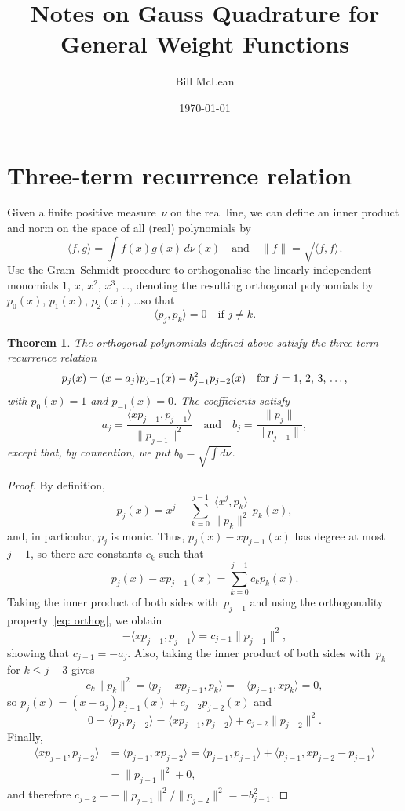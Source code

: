 \documentclass[12pt,a4paper]{article}
\title{Notes on Gauss Quadrature for General Weight Functions}
\author{Bill McLean}
\date{\today}
\newtheorem{theorem}{Theorem}
\newcommand{\iprod}[1]{\langle#1\rangle}
\begin{document}
\maketitle
\section{Three-term recurrence relation}
Given a finite positive measure~$\nu$ on the real line, we can define 
an inner product and norm on the space of all (real) polynomials by
\[
\iprod{f,g}=\int f(x)g(x)\,d\nu(x)\quad\text{and}\quad
\|f\|=\sqrt{\iprod{f,f}}.
\]
Use the Gram--Schmidt procedure to orthogonalise the linearly 
independent monomials $1$, $x$, $x^2$, $x^3$, \dots, denoting the 
resulting orthogonal polynomials by $p_0(x)$, $p_1(x)$, $p_2(x)$, 
\dots so that
\begin{equation}\label{eq: orthog}
\iprod{p_j,p_k}=0\quad\text{if $j\ne k$.}
\end{equation}

\begin{theorem}\label{thm: 3 term}
The orthogonal polynomials defined above satisfy the three-term 
recurrence relation
\[
p_j(x)=(x-a_j)p_{j-1}(x)-b_{j-1}^2p_{j-2}(x)
	\quad\text{for $j=1$, $2$, $3$, \dots,}
\]
with $p_0(x)=1$ and $p_{-1}(x)=0$.  The coefficients satisfy
\[
a_j=\frac{\iprod{xp_{j-1},p_{j-1}}}{\|p_{j-1}\|^2}
\quad\text{and}\quad
b_j=\frac{\|p_j\|}{\|p_{j-1}\|},
\]
except that, by convention, we put $b_0=\sqrt{\int d\nu}$.
\end{theorem}
\begin{proof}
By definition,
\[
p_j(x)=x^j-\sum_{k=0}^{j-1}\frac{\iprod{x^j,p_k}}{\|p_k\|^2}\,p_k(x),
\]
and, in particular, $p_j$ is monic.  Thus, $p_j(x)-xp_{j-1}(x)$ has
degree at most~$j-1$, so there are constants $c_k$ such that
\[
p_j(x)-xp_{j-1}(x)=\sum_{k=0}^{j-1}c_kp_k(x).
\]
Taking the inner product of both sides with~$p_{j-1}$ and using
the orthogonality property~\eqref{eq: orthog}, we obtain
\[
-\iprod{xp_{j-1},p_{j-1}}=c_{j-1}\|p_{j-1}\|^2,
\]
showing that $c_{j-1}=-a_j$.  Also, taking the inner product of both
sides with~$p_k$ for $k\le j-3$ gives
\[
c_k\|p_k\|^2=\iprod{p_j-xp_{j-1},p_k}=-\iprod{p_{j-1},xp_k}=0,
\]
so $p_j(x)=(x-a_j)p_{j-1}(x)+c_{j-2}p_{j-2}(x)$ and
\[
0=\iprod{p_j,p_{j-2}}=\iprod{xp_{j-1},p_{j-2}}+c_{j-2}\|p_{j-2}\|^2.
\]
Finally, 
\begin{align*}
\iprod{xp_{j-1},p_{j-2}}&=\iprod{p_{j-1},xp_{j-2}}
	=\iprod{p_{j-1},p_{j-1}}+\iprod{p_{j-1},xp_{j-2}-p_{j-1}}\\
	&=\|p_{j-1}\|^2+0,
\end{align*}
and therefore $c_{j-2}=-\|p_{j-1}\|^2/\|p_{j-2}\|^2=-b_{j-1}^2$.
\end{proof}
\end{document}
